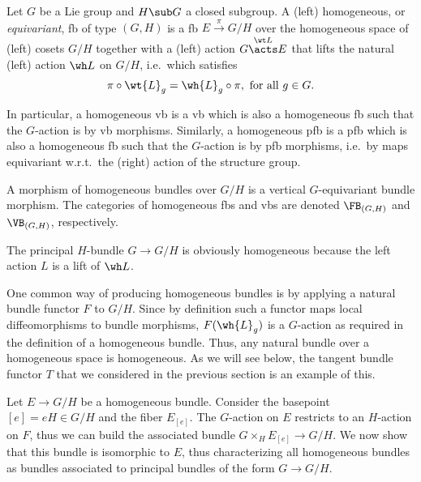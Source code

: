 \begin{defn}
    Let $G$ be a Lie group and $H\sub G$ a closed subgroup. A (left) homogeneous, or \emph{equivariant}, \gls{fb} of type $(G,H)$ is a \gls{fb} $E\overset{\pi}{\to}G\slash H$ over the homogeneous space of (left) cosets $G\slash H$ together with a (left) action $G\overset{\wt L}{\acts} E$ that lifts the natural (left) action $\wh L$ on $G\slash H$, i.e.\ which satisfies \[\pi\circ \wt{L}_g=\wh{L}_g\circ \pi,\text{ for all } g\in G.\] 

    In particular, a homogeneous \gls{vb} is a \gls{vb} which is also a homogeneous \gls{fb} such that the $G$-action is by \gls{vb} morphisms. Similarly, a homogeneous \gls{pfb} is a \gls{pfb} which is also a homogeneous \gls{fb} such that the $G$-action is by \gls{pfb} morphisms, i.e.\ by maps equivariant w.r.t.\ the (right) action of the structure group.

    A morphism of homogeneous bundles over $G\slash H$ is a vertical $G$-equivariant bundle morphism. The categories of homogeneous \glspl{fb} and \glspl{vb} are denoted $\FB_{(G,H)}$ and $\VB_{(G,H)}$, respectively. 
\end{defn}

\begin{example}
    The principal $H$-bundle $G\to G\slash H$ is obviously homogeneous because the left action $L$ is a lift of $\wh L$.
\end{example}

One common way of producing homogeneous bundles is by applying a natural bundle functor $F$ to $G\slash H$. Since by definition such a functor maps local diffeomorphisms to bundle morphisms, $F(\wh{L}_g)$ is a $G$-action as required in the definition of a homogeneous bundle. Thus, any natural bundle over a homogeneous space is homogeneous. As we will see below, the tangent bundle functor $T$ that we considered in the previous section is an example of this.

Let $E\to G\slash H$ be a homogeneous bundle. Consider the basepoint $[e]=eH\in G\slash H$ and the fiber $E_{[e]}$. The $G$-action on $E$ restricts to an $H$-action on $F$, thus we can build the associated bundle $G\times_H E_{[e]}\to G\slash H$. We now show that this bundle is isomorphic to $E$, thus characterizing all homogeneous bundles as bundles associated to principal bundles of the form $G\to G\slash H$.

